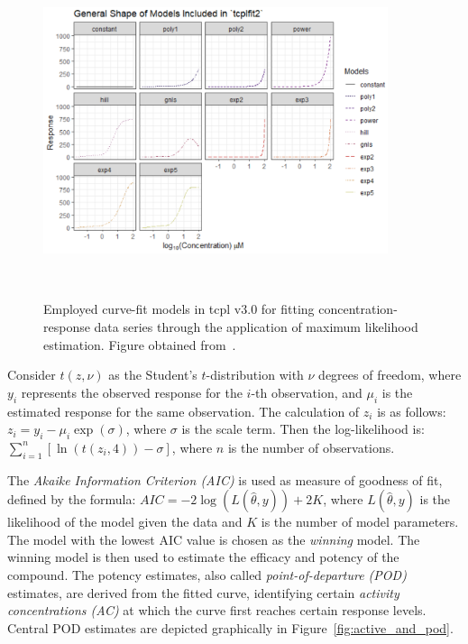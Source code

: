 \begin{figure}  %
    \centering
    \includegraphics[width=0.9\textwidth]{figures/fit_models.png}
    \caption{Employed curve-fit models in tcpl v3.0 for fitting concentration-response data series through the application of maximum likelihood estimation. Figure obtained from~\cite{tcplv3.0}.}
~\label{fig:tcplfit2_models}
\end{figure}


Consider $t(z, \nu)$ as the Student's $t$-distribution with $\nu$ degrees of freedom, where $y_i$ represents the observed response for the $i$-th observation, and $\mu_i$ is the estimated response for the same observation. The calculation of $z_i$ is as follows: $z_i = y_i - \mu_i \exp(\sigma)$, where $\sigma$ is the scale term. Then the log-likelihood is: $\sum_{i=1}^n [\ln(t(z_i,4)) - \sigma]$, where $n$ is the number of observations.

The \emph{Akaike Information Criterion (AIC)} is used as measure of goodness of fit, defined by the formula: $AIC = -2\log(L(\hat{\theta}, y)) + 2K$, where $L(\hat{\theta}, y)$ is the likelihood of the model given the data and $K$ is the number of model parameters. The model with the lowest AIC value is chosen as the \emph{winning} model. The winning model is then used to estimate the efficacy and potency of the compound. The potency estimates, also called \emph{point-of-departure (POD)} estimates, are derived from the fitted curve, identifying certain \emph{activity concentrations (AC)} at which the curve first reaches certain response levels. Central POD estimates are depicted graphically in Figure~\ref{fig:active_and_pod}.

